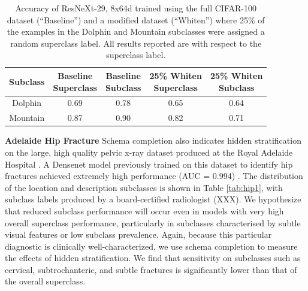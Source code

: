 \documentclass{article}
\begin{document}
\begin{table}[]
\centering
\begin{tabular}{|c|c|c|c|c|}
 \hline
 Subclass & \makecell{Baseline \\ Superclass} & \makecell{Baseline \\ Subclass}   &  \makecell{25\% Whiten \\ Superclass}    & \makecell{25\% Whiten \\ Subclass}   \\
 \hline 
 Dolphin & 0.69 & 0.78  & 0.65  & 0.64  \\
 Mountain & 0.87 & 0.90  & 0.82 & 0.71  \\
 \hline
\end{tabular}
\caption{Accuracy of ResNeXt-29, 8x64d trained using the full CIFAR-100 dataset (``Baseline'') and a modified dataset (``Whiten'') where 25\% of the examples in the Dolphin and Mountain subclasses were assigned a random superclass label.  All results reported are with respect to the superclass label.
}
\label{tab:cifar2}
\vspace{-8mm}
\end{table}


\textbf{Adelaide Hip Fracture} Schema completion also indicates hidden stratification on the large, high quality pelvic x-ray dataset produced at the Royal Adelaide Hospital \citep{Gale_W_Oakden-Rayner_L_Carneiro_G_Bradley_AP_Palmer_LJ2017-tl}.
 A Densenet model previously trained on this dataset to identify hip fractures achieved extremely high performance (AUC = 0.994) \citep{Gale_W_Oakden-Rayner_L_Carneiro_G_Bradley_AP_Palmer_LJ2017-tl}. 
 The distribution of the location and description subclasses is shown in Table \ref{tab:hip1}, with subclass labels produced by a board-certified radiologist (XXX).  
 We hypothesize that reduced subclass performance will occur even in models with very high overall superclass performance, particularly in subclasses characterised by subtle visual features or low subclass prevalence.  
 Again, because this particular diagnostic is clinically well-characterized, we use schema completion to measure the effects of hidden stratification.  
 We find that sensitivity on subclasses such as cervical, subtrochanteric, and subtle fractures is significantly lower than that of the overall superclass.  
 
\end{document}
